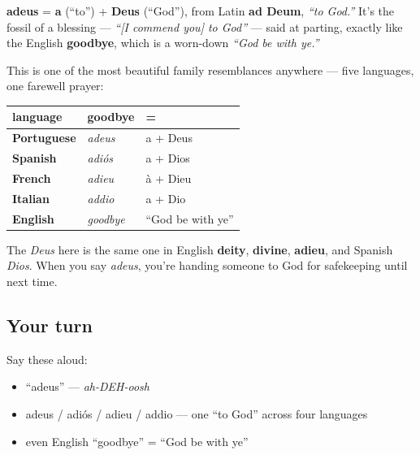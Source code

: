\begin{cousinweb}
\textbf{adeus} = \textbf{a} (\textquotedblleft{}to\textquotedblright{}) + \textbf{Deus} (\textquotedblleft{}God\textquotedblright{}), from Latin \textbf{ad Deum}, \emph{\textquotedblleft{}to God.\textquotedblright{}} It's the fossil of a blessing — \emph{\textquotedblleft{}{[}I commend you{]} to God\textquotedblright{}} — said at parting, exactly like the English \textbf{goodbye}, which is a worn-down \emph{\textquotedblleft{}God be with ye.\textquotedblright{}}

This is one of the most beautiful family resemblances anywhere — five languages, one farewell prayer:

\noindent
\begin{tabularx}{\linewidth}{@{}>{\raggedright\arraybackslash}X>{\raggedright\arraybackslash}X>{\raggedright\arraybackslash}X@{}}
\toprule
\textbf{language} & \textbf{goodbye} & \textbf{=} \\
\midrule
\textbf{Portuguese} & \emph{adeus} & a + Deus \\
\textbf{Spanish} & \emph{adiós} & a + Dios \\
\textbf{French} & \emph{adieu} & à + Dieu \\
\textbf{Italian} & \emph{addio} & a + Dio \\
\textbf{English} & \emph{goodbye} & \textquotedblleft{}God be with ye\textquotedblright{} \\
\bottomrule
\end{tabularx}

The \emph{Deus} here is the same one in English \textbf{deity}, \textbf{divine}, \textbf{adieu}, and Spanish \emph{Dios}. When you say \emph{adeus}, you're handing someone to God for safekeeping until next time.
\end{cousinweb}

\subsection*{Your turn}
Say these aloud:

\begin{itemize}
\raggedright
  \item \textquotedblleft{}adeus\textquotedblright{} — \emph{ah-DEH-oosh}
  \item adeus / adiós / adieu / addio — one \textquotedblleft{}to God\textquotedblright{} across four languages
  \item even English \textquotedblleft{}goodbye\textquotedblright{} = \textquotedblleft{}God be with ye\textquotedblright{}
\end{itemize}

